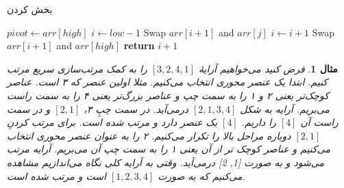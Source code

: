 \documentclass[12pt]{article}
\newtheorem{example}{مثال}
\begin{document}
\begin{algorithm}[H]
  \caption{بخش کردن}
  \label{alg:a6}
  \begin{latin}
    \begin{algorithmic}[1]
      \State $pivot \gets arr[high]$
      \State $i \gets low - 1$
      \State Swap $arr[i+1]$ and $arr[j]$
      \State $i \gets i + 1$
      \EndIf
      \EndFor
      \State Swap $arr[i+1]$ and $arr[high]$
      \State \textbf{return} $i+1$
      \EndProcedure
    \end{algorithmic}
  \end{latin}
\end{algorithm}

\begin{example}
  فرض کنید می‌خواهیم آرایهٔ $[3, 2, 4, 1]$
  را به کمک مرتب‌سازی سریع مرتب کنیم.
  ابتدا یک عنصر محوری انتخاب می‌کنیم.
  مثلا اولین عنصر که ۳ است.
  عناصر کوچک‌تر یعنی ۲ و ۱ را به سمت چپ و
  عناصر بزرگ‌تر یعنی ۴ را به سمت راست می‌بریم.
  آرایه به شکل
  $[2,1,3,4]$
  درمی‌آید.
  در سمت چپِ ۳،
  $[2, 1]$
  و در سمت راست آن $[4]$
  را داریم.
  $[4]$
  یک عنصر دارد و مرتب شده است.
  برای مرتب کردنِ
  $[2, 1]$
  دوباره مراحل بالا را تکرار می‌کنیم.
  ۲
  را به عنوان عنصر محوری انتخاب می‌کنیم و
  عناصر کوچک تر از آن یعنی ۱ را به سمت چپ آن می‌بریم.
  آرایه مرتب می‌شود و به صورت
  [1, 2]
  درمی‌آید.
  وقتی به آرایه کلی نگاه می‌اندازیم مشاهده می‌کنیم که به صورت
  $[1, 2, 3, 4]$
  است و مرتب شده است.


\end{example}

{
\fontsize{12pt}{10pt}\selectfont


}
\end{document}

